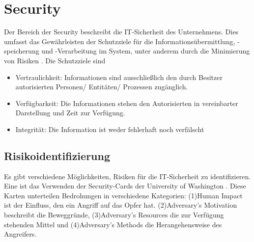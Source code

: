 \section{Security}
Der Bereich der Security beschreibt die IT-Sicherheit des Unternehmens. Dies umfasst das Gewährleisten der Schutzziele
für die Informationsübermittlung, -speicherung und -Verarbeitung im System, unter anderem durch die Minimierung von Risiken \cite{BSIBundesamtfurSicherheitinderInformationstechnik.2008}. Die Schutzziele sind
\begin{itemize}
      \item Vertraulichkeit: Informationen sind ausschließlich den durch Besitzer autorisierten Personen/ Entitäten/ Prozessen zugänglich.
      \item Verfügbarkeit: Die Informationen stehen den Autorisierten in vereinbarter Darstellung und Zeit zur Verfügung.
      \item Integrität: Die Information ist weder fehlerhaft noch verfälscht
\end{itemize}
\subsection{Risikoidentifizierung}
\label{Risikoidentifizierung}
Es gibt verschiedene Möglichkeiten, Risiken für die IT-Sicherheit zu identifizieren. Eine ist das Verwenden der \glqq{}Security-Cards\grqq{} der University of Washington \cite{Denning.2013}.
Diese Karten unterteilen Bedrohungen in verschiedene Kategorien: (1)\glqq{}Human Impact\grqq{} ist der Einfluss, den ein Angriff auf das Opfer hat. (2)\glqq{}Adversary's Motivation\grqq{} beschreibt die Beweggründe,
(3)\glqq{}Adversary's Resources\grqq{} die zur Verfügung stehenden Mittel und (4)\glqq{}Adversary's Methods\grqq{} die Herangehensweise des Angreifers.

